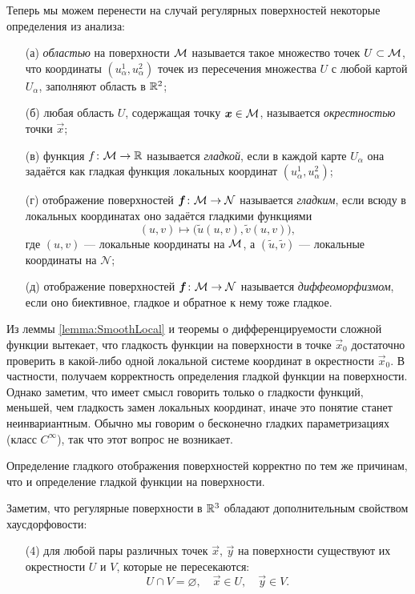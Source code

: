 Теперь мы можем перенести на случай регулярных поверхностей некоторые определения из анализа:

\begin{enumerate}[nolistsep]
	\item[(а)] \textit{областью} на поверхности $\mathcal{M}$ называется такое множество точек $U \subset \mathcal{M}$, что координаты $(u_\alpha^1, u_\alpha^2)$ точек из пересечения множества $U$ с любой картой $U_\alpha$, заполняют область в $\mathbb{R}^2$;
	\item[(б)] любая область $U$, содержащая точку $\boldsymbol{x} \in \mathcal{M}$, называется \textit{окрестностью} точки $\vec{x}$;
	\item[(в)] функция $f\colon \mathcal{M} \to \mathbb{R}$ называется \textit{гладкой}, если в каждой карте $U_\alpha$ она задаётся как гладкая функция локальных координат $(u_\alpha^1, u_\alpha^2)$;
	\item[(г)] отображение поверхностей $\boldsymbol{f}\colon \mathcal{M} \to \mathcal{N}$ называется \textit{гладким}, если всюду в локальных координатах оно задаётся гладкими функциями
		\[
			(u, v) \mapsto \big(\widetilde{u}(u, v), \widetilde{v}(u, v)\big),
		\]
		где $(u, v)$ --- локальные координаты на $\mathcal{M}$, а $(\widetilde{u}, \widetilde{v})$ --- локальные координаты на $\mathcal{N}$;
	\item[(д)] отображение поверхностей $\boldsymbol{f}\colon \mathcal{M} \to \mathcal{N}$ называется \textit{диффеоморфизмом}, если оно биективное, гладкое и обратное к нему тоже гладкое.
\end{enumerate}

Из леммы \ref{lemma:SmoothLocal} и теоремы о дифференцируемости сложной функции вытекает, что гладкость функции на поверхности в точке $\vec{x}_0$ достаточно проверить в какой-либо одной локальной системе координат в окрестности $\vec{x}_0$. В частности, получаем корректность определения гладкой функции на поверхности. Однако заметим, что имеет смысл говорить только о гладкости функций, меньшей, чем гладкость замен локальных координат, иначе это понятие станет неинвариантным. Обычно мы говорим о бесконечно гладких параметризациях (класс $C^\infty$), так что этот вопрос не возникает.

Определение гладкого отображения поверхностей корректно по тем же причинам, что и определение гладкой функции на поверхности.

Заметим, что регулярные поверхности в $\mathbb{R}^3$ обладают дополнительным свойством хаусдорфовости:
\begin{enumerate}[nolistsep, label=(\arabic*)]
	\item[(4)] для любой пары различных точек $\vec{x}$, $\vec{y}$ на поверхности существуют их окрестности $U$ и $V$, которые не пересекаются:
		\[
			U \cap V = \varnothing,\quad \vec{x} \in U,\quad \vec{y} \in V.
		\]
\end{enumerate}

